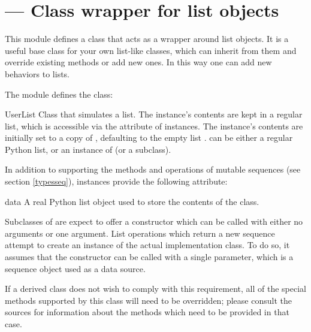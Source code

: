 \section{ ---
         Class wrapper for list objects}




This module defines a class that acts as a wrapper around
list objects.  It is a useful base class for
your own list-like classes, which can inherit from
them and override existing methods or add new ones.  In this way one
can add new behaviors to lists.

The  module defines the  class:

\begin{classdesc}{UserList}{}
Class that simulates a list.  The instance's
contents are kept in a regular list, which is accessible via the
 attribute of  instances.  The instance's
contents are initially set to a copy of , defaulting to the
empty list \code{[]}.   can be either a regular Python list,
or an instance of  (or a subclass).
\end{classdesc}

In addition to supporting the methods and operations of mutable
sequences (see section \ref{typesseq}),  instances
provide the following attribute:

\begin{memberdesc}{data}
A real Python list object used to store the contents of the
 class.
\end{memberdesc}

Subclasses of  are expect to offer a constructor which
can be called with either no arguments or one argument.  List
operations which return a new sequence attempt to create an instance
of the actual implementation class.  To do so, it assumes that the
constructor can be called with a single parameter, which is a sequence
object used as a data source.

If a derived class does not wish to comply with this requirement, all
of the special methods supported by this class will need to be
overridden; please consult the sources for information about the
methods which need to be provided in that case.

